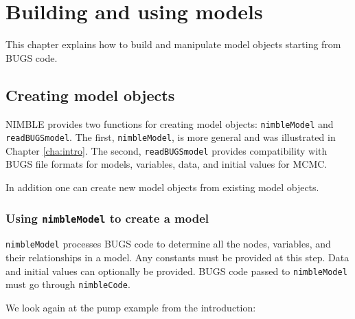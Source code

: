 \documentclass[12pt,oneside]{book}\usepackage[]{graphicx}\usepackage[]{color}
\def\cd#1{\texttt{#1}}
\begin{document}
\chapter{Building and using models}
\label{cha:building-models}

This chapter explains how to build and manipulate model objects
starting from BUGS code.


\section{Creating model objects}

NIMBLE provides two functions for creating model objects:
\cd{nimbleModel} and \cd{readBUGSmodel}. The first, \cd{nimbleModel},
is more general and was illustrated in Chapter \ref{cha:intro}. The
second, \cd{readBUGSmodel} provides compatibility with BUGS file
formats for models, variables, data, and initial values for MCMC.  

In addition one can create new model objects from existing model objects.

\subsection{Using \cd{nimbleModel} to create a model}

\cd{nimbleModel} processes BUGS code to determine all the nodes,
variables, and their relationships in a model.  Any constants must be
provided at this step.  Data and initial values can optionally be
provided.  BUGS code passed to \cd{nimbleModel} must go through
\cd{nimbleCode}.

We look again at the pump example from the introduction:
\end{document}
